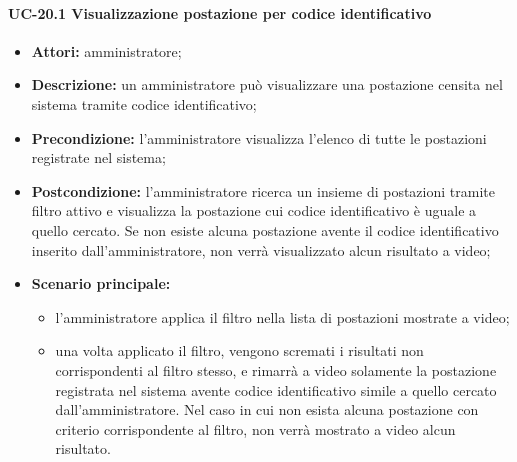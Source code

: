\paragraph{UC-20.1 Visualizzazione postazione per codice identificativo}
\begin{itemize}
    \item \textbf{Attori:} amministratore;
    \item \textbf{Descrizione:} un amministratore pu\`{o} visualizzare una postazione censita nel sistema tramite codice identificativo;
    \item \textbf{Precondizione:} l'amministratore visualizza l'elenco di tutte le postazioni registrate nel sistema;
    \item \textbf{Postcondizione:} l'amministratore ricerca un insieme di postazioni tramite filtro attivo e visualizza la postazione cui codice identificativo è uguale a quello cercato. Se non esiste alcuna postazione avente il codice identificativo inserito dall'amministratore, non verrà visualizzato alcun risultato a video;
    \item \textbf{Scenario principale:}
    \begin{itemize}
        \item l'amministratore applica il filtro nella lista di postazioni mostrate a video;
        \item una volta applicato il filtro, vengono scremati i risultati non corrispondenti al filtro stesso, e rimarrà a video solamente la postazione registrata nel sistema avente codice identificativo simile a quello cercato dall'amministratore. Nel caso in cui non esista alcuna postazione con criterio corrispondente al filtro, non verrà mostrato a video alcun risultato.
    \end{itemize}
\end{itemize}


